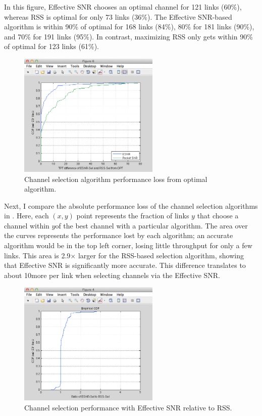 In this figure, Effective SNR chooses an optimal channel for 121 links (60\%), whereas RSS is optimal for only 73 links (36\%). The Effective SNR-based algorithm is within 90\% of optimal for 168 links (84\%), 80\% for 181 links (90\%), and 70\% for 191 links (95\%). In contrast, maximizing RSS only gets within 90\% of optimal for 123 links (61\%).

\begin{figure}[htp]
	\centering
	\includegraphics[width=0.6\textwidth]{figures/esnr/chan_sel_delta_opt.png}
	\caption{\label{fig:chan_sel_delta_opt}Channel selection algorithm performance loss from optimal algorithm.}
\end{figure}

Next, I compare the absolute performance loss of the channel selection algorithms in . Here, each $(x,y)$ point represents the fraction of links $y$ that choose a channel within $y$\Mbps of the best channel with a particular algorithm. The area over the curves represents the performance lost by each algorithm; an accurate algorithm would be in the top left corner, losing little throughput for only a few links. This area is 2.9$\times$ larger for the RSS-based selection algorithm, showing that Effective SNR is significantly more accurate. This difference translates to about 10\Mbps more per link when selecting channels via the Effective SNR\@.

\begin{figure}[htp]
	\centering
	\includegraphics[width=0.6\textwidth]{figures/esnr/chan_sel_ratio.png}
	\caption{\label{fig:chan_sel_ratio}Channel selection performance with Effective SNR relative to RSS\@.}
\end{figure}

